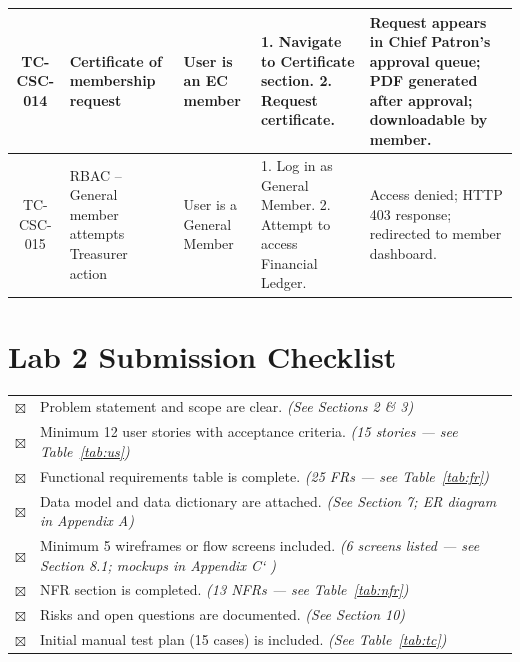 \documentclass[12pt,a4paper]{article}
\begin{document}
\begin{center}
\begin{longtable}{|c|p{3cm}|p{2.5cm}|p{3.5cm}|p{4cm}|}
\rowcolor{LightBlue}
TC-CSC-014 & Certificate of membership request & User is an EC member & 1. Navigate to Certificate section. 2. Request certificate. & Request appears in Chief Patron's approval queue; PDF generated after approval; downloadable by member. \\ \hline

\rowcolor{LightTeal}
TC-CSC-015 & RBAC -- General member attempts Treasurer action & User is a General Member & 1. Log in as General Member. 2. Attempt to access Financial Ledger. & Access denied; HTTP 403 response; redirected to member dashboard. \\ \hline

\end{longtable}
\end{center}
\section{Lab 2 Submission Checklist}

\vspace{4pt}
\noindent
\begin{tabular}{>{\columncolor{Teal}\color{black}\bfseries\small\centering\arraybackslash}p{0.65cm}%
                >{\small\color{DarkGray}}p{14.4cm}}
$\boxtimes$ & Problem statement and scope are clear. \emph{(See Sections 2 \& 3)}\\[2pt]
\rowcolor{RowA}$\boxtimes$ & Minimum 12 user stories with acceptance criteria. \emph{(15 stories --- see Table~\ref{tab:us})}\\[2pt]
$\boxtimes$ & Functional requirements table is complete. \emph{(25 FRs --- see Table~\ref{tab:fr})}\\[2pt]
\rowcolor{RowA}$\boxtimes$ & Data model and data dictionary are attached. \emph{(See Section 7; ER diagram in Appendix A)}\\[2pt]
$\boxtimes$ & Minimum 5 wireframes or flow screens included. \emph{(6 screens listed --- see Section 8.1; mockups in Appendix C`    )}\\[2pt]
\rowcolor{RowA}$\boxtimes$ & NFR section is completed. \emph{(13 NFRs --- see Table~\ref{tab:nfr})}\\[2pt]
$\boxtimes$ & Risks and open questions are documented. \emph{(See Section 10)}\\[2pt]
\rowcolor{RowA}$\boxtimes$ & Initial manual test plan (15 cases) is included. \emph{(See Table~\ref{tab:tc})}\\[2pt]
\end{tabular}
\vspace{8pt}
\end{document}
